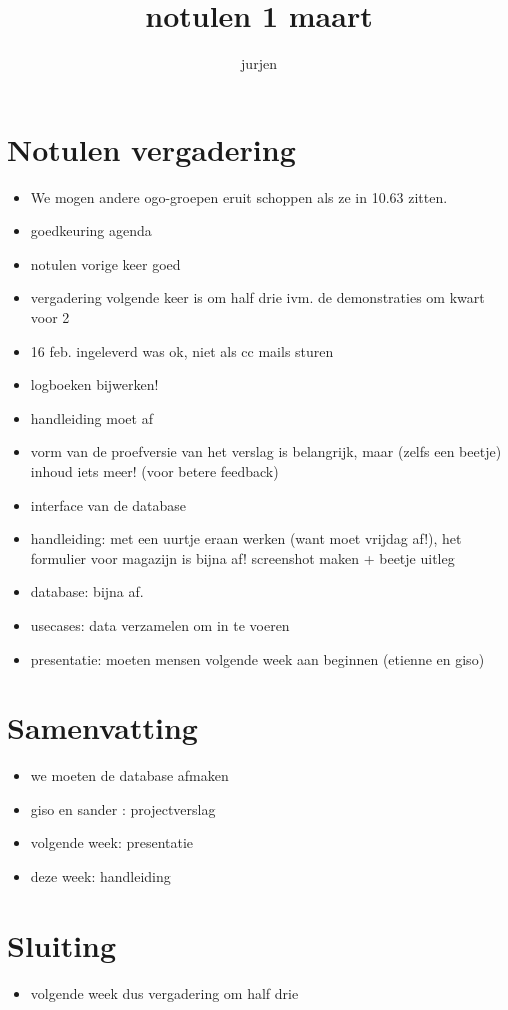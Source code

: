 \documentclass[10pt,a4paper]{article}
\author{jurjen}
\title{notulen 1 maart}
\begin{document}
\maketitle
\section {Notulen vergadering}
\begin{itemize}
   \item We mogen andere ogo-groepen eruit schoppen als ze in 10.63 zitten.
   \item goedkeuring agenda
   \item notulen vorige keer goed
   \item vergadering volgende keer is om half drie ivm. de demonstraties om kwart voor 2
   \item 16 feb. ingeleverd was ok, niet als cc mails sturen
   \item logboeken bijwerken!
   \item handleiding moet af
   \item vorm van de proefversie van het verslag is belangrijk, maar (zelfs een beetje) inhoud iets meer! (voor betere feedback)
   \item interface van de database
   \item handleiding: met een uurtje eraan werken (want moet vrijdag af!), het formulier voor magazijn is bijna af! screenshot maken + beetje uitleg
   \item database: bijna af.
   \item usecases: data verzamelen om in te voeren
   \item presentatie: moeten mensen volgende week aan beginnen (etienne en giso)
\end{itemize}

\section{Samenvatting}
\begin{itemize}
   \item we moeten de database afmaken
   \item giso en sander : projectverslag
   \item volgende week: presentatie
   \item deze week: handleiding
\end{itemize}

\section{Sluiting}
\begin{itemize}
   \item volgende week dus vergadering om half drie
\end{itemize}
\end{document}
